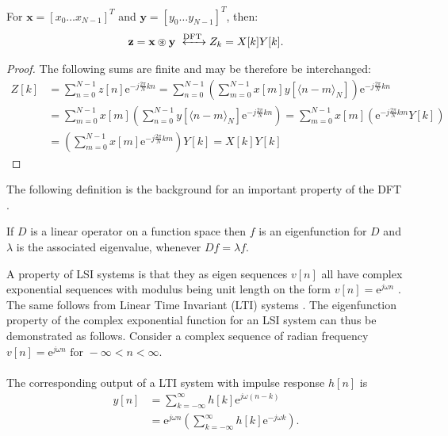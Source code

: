 \begin{theorem}
For $\textbf{x} = [x_0 \dots x_{N-1}]^T$ and $\textbf{y} = [y_0 \dots y_{N-1}]^T$, then:
\begin{align*}
\textbf{z} = \textbf{x} \circledast \textbf{y} \xleftrightarrow{\text{DFT}} Z_k = X[k] Y[k].
\end{align*}
\end{theorem}

\begin{proof}
The following sums are finite and may be therefore be interchanged:
\begin{align*}
Z[k] &= \sum_{n=0}^{N-1} z[n] \text{e}^{-j\frac{2\pi}{N}kn} = \sum_{n=0}^{N-1} \left( \sum_{m=0}^{N-1} x[m] y[\langle n-m\rangle_N] \right) \text{e}^{-j\frac{2\pi}{N}kn} \\
&= \sum_{m=0}^{N-1} x[m] \left( \sum_{n=0}^{N-1} y[\langle n-m\rangle_N]\text{e}^{-j\frac{2\pi}{N}kn} \right) = \sum_{m=0}^{N-1} x[m] \left( \text{e}^{-j\frac{2\pi}{N}km}Y[k] \right) \\
&= \left( \sum_{m=0}^{N-1} x[m] \text{e}^{-j\frac{2\pi}{N}km} \right)Y[k] = X[k] Y[k]
\end{align*}
\end{proof}

The following definition is the background for an important property of the DFT \cite{Eigenfunctions}.

\begin{definition}
If $D$ is a linear operator on a function space then $f$ is an eigenfunction for $D$ and $\lambda$ is the associated eigenvalue, whenever $Df = \lambda f$.
\end{definition}

A property of LSI systems is that they as eigen sequences $v[n]$ all have complex exponential sequences with modulus being unit length on the form $v[n] = \text{e}^{j \omega n}$ \cite{FSP}.\\ The same follows from Linear Time Invariant (LTI) systems \cite{DTSP}.
The eigenfunction property of the complex exponential function for an LSI system can thus be demonstrated as follows. Consider a complex sequence of radian frequency $v[n] = \text{e}^{j\omega n} \text{ for } -\infty < n < \infty$.
\\\\
The corresponding output of a LTI system with impulse response $h[n]$ is
\begin{align*}
y[n] 
&= \sum_{k=-\infty}^{\infty} h[k]\text{e}^{j\omega(n-k)} \nonumber \\ 
&= \text{e}^{j\omega n} \left(\sum_{k=-\infty}^{\infty} h[k]\text{e}^{-j\omega k} \right).
\end{align*}

